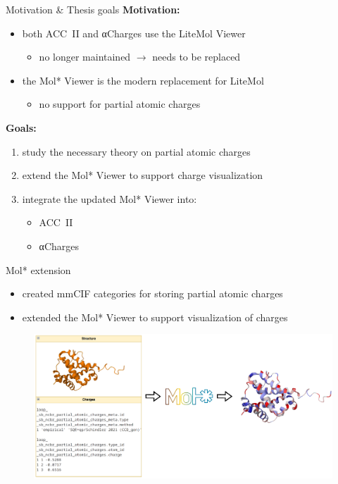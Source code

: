 \documentclass[
]{beamer}
\begin{document}
\begin{frame}{Motivation \& Thesis goals}
  \textbf{Motivation:}
  \begin{itemize}
    \item both ACC~II and αCharges use the LiteMol Viewer
    \begin{itemize}
      \item no longer maintained $\rightarrow$ needs to be replaced
    \end{itemize}
    \item the Mol* Viewer is the modern replacement for LiteMol
    \begin{itemize}
      \item no support for partial atomic charges
    \end{itemize}
  \end{itemize}
  \vspace{10pt}
  \textbf{Goals:}
  \begin{enumerate}
    \item study the necessary theory on partial atomic charges
    \item extend the Mol* Viewer to support charge visualization
    \item integrate the updated Mol* Viewer into:
    \begin{itemize}
      \item ACC~II
      \item αCharges
    \end{itemize}
  \end{enumerate}
\end{frame}
    
\begin{frame}{Mol* extension}
  \begin{itemize}
    \item created mmCIF categories for storing partial atomic charges
    \item extended the Mol* Viewer to support visualization of charges
  \end{itemize}
  \begin{figure}
    \includegraphics[width=\textwidth,keepaspectratio]{images/molstar-use-case.png}
  \end{figure}
\end{frame}
\end{document}
